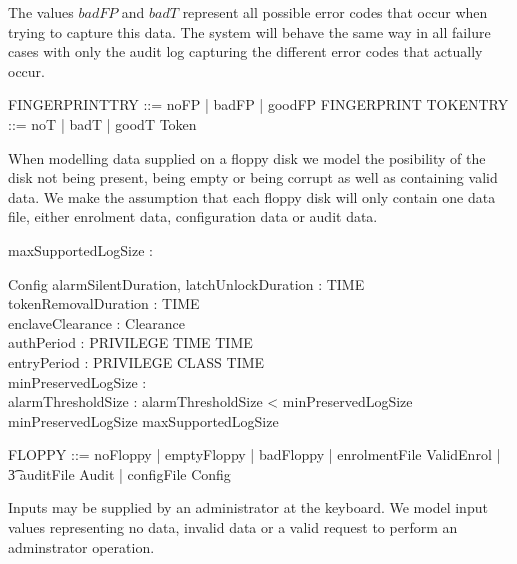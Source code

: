 The values $badFP$ and $badT$ represent all possible error codes that
occur when trying to capture this data. The system will behave the
same way in all failure cases with only the audit log capturing the
different error codes that actually occur.
\begin{zed}
	FINGERPRINTTRY ::= noFP | badFP | goodFP \ldata FINGERPRINT \rdata
\also
	TOKENTRY ::= noT | badT | goodT \ldata Token \rdata
\end{zed}

When modelling data supplied on a floppy disk we model the posibility
of the disk not being present, being empty or being corrupt as well as
containing valid data.
We make the assumption that each floppy disk will only contain one
data file, either enrolment data, configuration data or audit data.

\begin{zed} [Audit] \end{zed} %
\begin{axdef}
   maxSupportedLogSize : \nat
\end{axdef}
\begin{schema}{Config}
	alarmSilentDuration, latchUnlockDuration : TIME
\\      tokenRemovalDuration : TIME
\\      enclaveClearance : Clearance
\\      authPeriod : PRIVILEGE \fun TIME \fun \power TIME
\\      entryPeriod : PRIVILEGE \fun CLASS \fun \power TIME
\\      minPreservedLogSize : \nat
\\      alarmThresholdSize : \nat
\where
        alarmThresholdSize < minPreservedLogSize 
\\      minPreservedLogSize \leq maxSupportedLogSize     
\end{schema} %

\begin{zed}
       FLOPPY ::=  noFloppy | emptyFloppy | badFloppy | 
       enrolmentFile \ldata ValidEnrol \rdata |
\\ \t3    auditFile \ldata \finset Audit \rdata |
          configFile \ldata Config \rdata
\end{zed}

Inputs may be supplied by an administrator at the keyboard. We model
input values representing no data, invalid data or a valid request to
perform an adminstrator operation.

